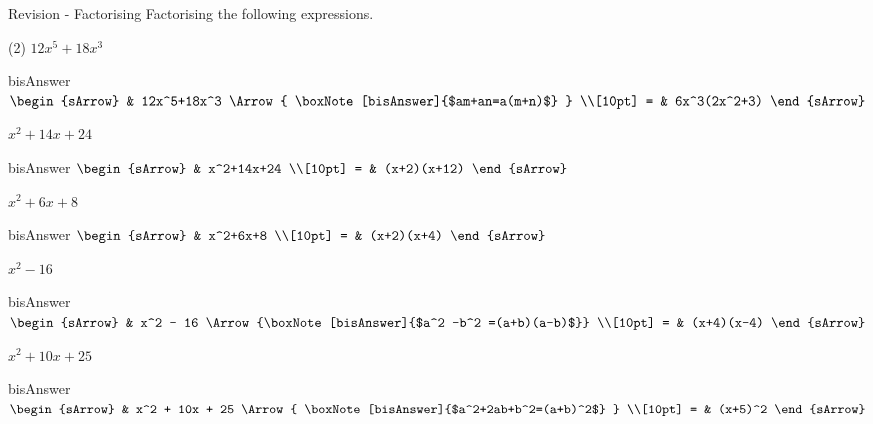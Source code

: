 \setcounter{ncnt}{0}
\clearpage\noindent%
\begin{bxTip}{\hypertarget{url09A}{Revision - Factorising}}    
    Factorising the following expressions.
\begin{tasksample}(2)
    \task[] $12x^5+18x^3$
              \begin{envOut}[equal height group=hRevF1]{bisAnswer}
			       $\begin{sArrow}
			             & 12x^5+18x^3    \Arrow{ \boxNote[bisAnswer]{$am+an=a(m+n)$} } \\[10pt]
                       = & 6x^3(2x^2+3)              
	                \end{sArrow}$
              \end{envOut}
 
	\task[] $x^2+14x+24$
              \begin{envOut}[equal height group=hRevF1]{bisAnswer}
			     $\begin{sArrow}
  				        & x^2+14x+24         \\[10pt] 
                      = & (x+2)(x+12)   
                  \end{sArrow}$					  
              \end{envOut}%
	\task[] $x^2+6x+8$
              \begin{envOut}[equal height group=hRevF1]{bisAnswer}
			     $\begin{sArrow}
  				        & x^2+6x+8           \\[10pt] 
                      = & (x+2)(x+4)   
                  \end{sArrow}$					  
              \end{envOut}%
	\task[] $x^2 - 16 $
              \begin{envOut}[equal height group=hRevF1]{bisAnswer}
			     $\begin{sArrow}
  				        & x^2 - 16           \Arrow{\boxNote[bisAnswer]{$a^2 -b^2 =(a+b)(a-b)$}}  \\[10pt] 
                      = & (x+4)(x-4)   
                  \end{sArrow}$					  
              \end{envOut}%

    \task[] $x^2 + 10x + 25 $
              \begin{envOut}[equal height group=hRevF1]{bisAnswer}
			       $\begin{sArrow}
			             & x^2 + 10x + 25     \Arrow{ \boxNote[bisAnswer]{$a^2+2ab+b^2=(a+b)^2$} } \\[10pt]
                       = & (x+5)^2              
	                \end{sArrow}$
              \end{envOut}



\end{tasksample}
\end{bxTip}
